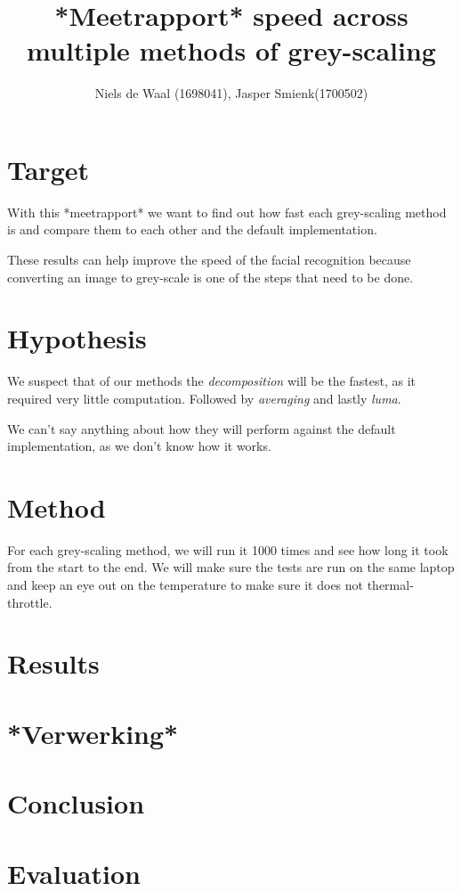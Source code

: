 \documentclass[a4paper]{article}
\begin{document}
\title{*Meetrapport* speed across multiple methods of grey-scaling}
\author{Niels de Waal (1698041), Jasper Smienk(1700502)}
\maketitle
\newpage

\tableofcontents
\newpage

\section{Target}
With this *meetrapport* we want to find out how fast each grey-scaling method is and compare them to each other and the default implementation.

These results can help improve the speed of the facial recognition because converting an image to grey-scale is one of the steps that need to be done.

\section{Hypothesis}
We suspect that of our methods the \textit{decomposition} will be the fastest, as it required very little computation. Followed by \textit{averaging} and lastly \textit{luma}.

We can't say anything about how they will perform against the default implementation, as we don't know how it works.

\section{Method}
For each grey-scaling method, we will run it 1000 times and see how long it took from the start to the end. We will make sure the tests are run on the same laptop and keep an eye out on the temperature to make sure it does not thermal-throttle.


\section{Results}

\section{*Verwerking*}

\section{Conclusion}

\section{Evaluation}

\begin{thebibliography}{9}
\end{thebibliography}
\end{document}
